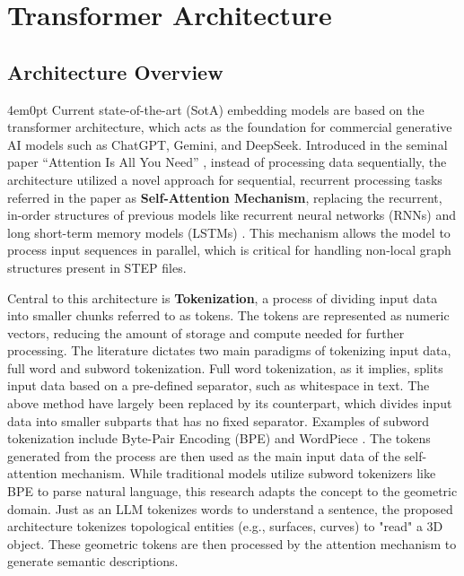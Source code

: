 \section{Transformer Architecture}
	\subsection{Architecture Overview}
		\begin{indentedblock}{4em}{0pt}
			Current state-of-the-art (SotA) embedding models are based on the transformer architecture, which acts as the foundation for commercial generative AI models such as ChatGPT, Gemini, and DeepSeek. Introduced in the seminal paper ``Attention Is All You Need''  \parencite{attention_is_all_you_need_vaswani}, instead of processing data sequentially, the architecture utilized a novel approach for sequential, recurrent processing tasks referred in the paper as \textbf{Self-Attention Mechanism}, replacing the recurrent, in-order structures of previous models like recurrent neural networks (RNNs) and long short-term memory models (LSTMs) \parencites{fundamentals_of_rnn_sherstinsky}{lstm_hochreiter}. This mechanism allows the model to process input sequences in parallel, which is critical for handling non-local graph structures present in STEP files. 
			
			
			Central to this architecture is \textbf{Tokenization}, a process of dividing input data into smaller chunks referred to as tokens. The tokens are represented as numeric vectors, reducing the amount of storage and compute needed for further processing. The literature dictates two main paradigms of tokenizing input data, full word and subword tokenization. Full word tokenization, as it implies, splits input data based on a pre-defined separator, such as whitespace in text. The above method have largely been replaced by its counterpart, which divides input data into smaller subparts that has no fixed separator. Examples of subword tokenization include Byte-Pair Encoding (BPE) and WordPiece \parencites{subword_tokenization_method_burak}{bpe_kozma}{bert_devlin}. The tokens generated from the process are then used as the main input data of the self-attention mechanism. While traditional models utilize subword tokenizers like BPE to parse natural language, this research adapts the concept to the geometric domain. Just as an LLM tokenizes words to understand a sentence, the proposed architecture tokenizes topological entities (e.g., surfaces, curves) to "read" a 3D object. These geometric tokens are then processed by the attention mechanism to generate semantic descriptions.
			

\end{indentedblock}
